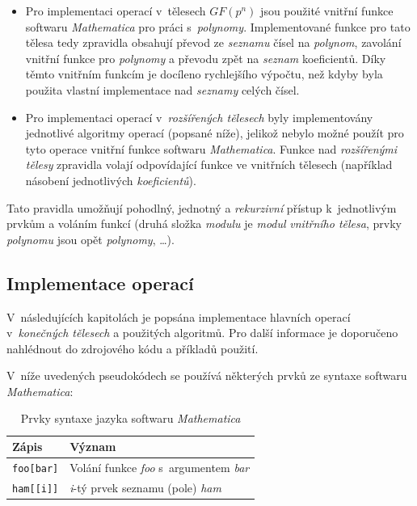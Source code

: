 \documentclass[thesis=M,czech,hidelinks]{FITthesis}[2012/06/26]
\newcommand{\0}{{\textcolor[gray]{0.80}{0}}}
\begin{document}
\begin{itemize}
    \item Pro implementaci operací v~tělesech $GF(p^n)$ jsou použité vnitřní
        funkce softwaru \emph{Mathematica} pro práci s~\emph{polynomy}.
        Implementované funkce pro tato tělesa tedy zpravidla obsahují převod ze
        \emph{seznamu} čísel na \emph{polynom}, zavolání vnitřní funkce pro
        \emph{polynomy} a převodu zpět na \emph{seznam} koeficientů. Díky těmto
        vnitřním funkcím je docíleno rychlejšího výpočtu, než kdyby byla použita
        vlastní implementace nad \emph{seznamy} celých čísel.

    \item Pro implementaci operací v~\emph{rozšířených tělesech} byly
        implementovány jednotlivé algoritmy operací (popsané níže), jelikož
        nebylo možné použít pro tyto operace vnitřní funkce softwaru
        \emph{Mathematica}. Funkce nad \emph{rozšířenými tělesy} zpravidla
        volají odpovídající funkce ve vnitřních tělesech (například násobení
        jednotlivých \emph{koeficientů}).

\end{itemize}

Tato pravidla umožňují pohodlný, jednotný a \emph{rekurzivní} přístup
k~jednotlivým prvkům a voláním funkcí (druhá složka \emph{modulu} je
\emph{modul} \emph{vnitřního tělesa}, prvky \emph{polynomu} jsou opět
\emph{polynomy}, \ldots).

\subsection{Implementace operací}

V~následujících kapitolách je popsána implementace hlavních operací
v~\emph{konečných tělesech} a použitých algoritmů.  Pro další informace je
doporučeno nahlédnout do zdrojového kódu a příkladů použití.

V~níže uvedených pseudokódech se používá některých prvků ze syntaxe softwaru
\emph{Mathematica}:

\begin{table}[!ht]
    \centering
    \begin{tabular}{l  l}
        Zápis               & Význam                                            \\
        \hline
        \texttt{foo[bar]}   & Volání funkce \emph{foo} s~argumentem \emph{bar}  \\
        \texttt{ham[[i]]}   & \emph{i}-tý prvek seznamu (pole) \emph{ham}       \\
    \end{tabular}
    \caption{Prvky syntaxe jazyka softwaru \emph{Mathematica}}
\end{table}
\end{document}
